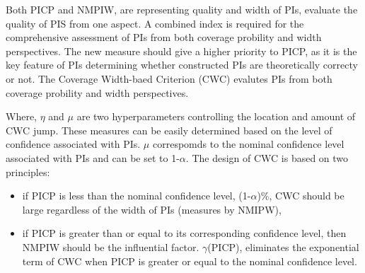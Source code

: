 \documentclass[review]{elsarticle}
\begin{document}
      Both PICP and NMPIW, are representing quality and width of PIs, evaluate the quality of PIS from one aspect. A combined index is required for the comprehensive assessment of PIs from both coverage probility and width perspectives. The new measure should give a higher priority to PICP, as it is the key feature of PIs determining whether constructed PIs are theoretically correcty or not. The Coverage Width-baed Criterion (CWC) evalutes PIs from both coverage probility and width perspectives.

      Where, $\eta$ and $\mu$ are two hyperparameters controlling the location and amount of CWC jump. These measures can be easily determined based on the level of confidence associated with PIs. $\mu$ correspomds to the nominal confidence level associated with PIs and can be set to 1-$\alpha$. The design of CWC is based on two principles:

      \begin{itemize}
        \item if PICP is less than the nominal confidence level, (1-$\alpha$)$\%$, CWC should be large regardless of the width of PIs (measures by NMIPW),
        \item if PICP is greater than or equal to its corresponding confidence level, then NMPIW should be the influential factor. $\gamma$(PICP), eliminates the exponential term of CWC when PICP is greater or equal to the nominal confidence level.
      \end{itemize}
\end{document}
